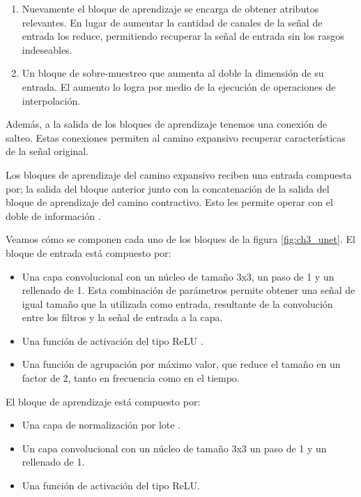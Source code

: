 \begin{enumerate}
	\item Nuevamente el bloque de aprendizaje se encarga de obtener atributos relevantes. En lugar de aumentar la cantidad de canales de la señal de entrada los reduce, permitiendo recuperar la señal de entrada sin los rasgos indeseables.
	
	\item Un bloque de sobre-muestreo que aumenta al doble la dimensión de su entrada. El aumento lo logra por medio de la ejecución de operaciones de interpolación.
\end{enumerate}

Además, a la salida de los bloques de aprendizaje tenemos una conexión de salteo. Estas conexiones permiten al camino expansivo recuperar características de la señal original. 

Los bloques de aprendizaje del camino expansivo reciben una entrada compuesta por; la salida del bloque anterior junto con la concatenación de la salida del bloque de aprendizaje del camino contractivo. Esto les permite operar con el doble de información \cite{the_importance_of_skip_connections_in_biomedical_image_segmentation}.

Veamos cómo se componen cada uno de los bloques de la figura \ref{fig:ch3_unet}. El bloque de entrada está compuesto por:

\begin{itemize}
	\item Una capa convolucional con un núcleo de tamaño 3x3, un paso de 1 y un rellenado de 1. Esta combinación de parámetros permite obtener una señal de igual tamaño que la utilizada como entrada, resultante de la convolución entre los filtros y la señal de entrada a la capa.
	\item Una función de activación del tipo ReLU \cite{deep_learning}.
	\item Una función de agrupación por máximo valor, que reduce el tamaño en un factor de 2, tanto en frecuencia como en el tiempo.
\end{itemize}

El bloque de aprendizaje está compuesto por:

\begin{itemize}
	\item Una capa de normalización por lote \cite{deep_learning}.
	\item Un capa convolucional con un núcleo de tamaño 3x3 un paso de 1 y un rellenado de 1.
	\item Una función de activación del tipo ReLU.
\end{itemize}

